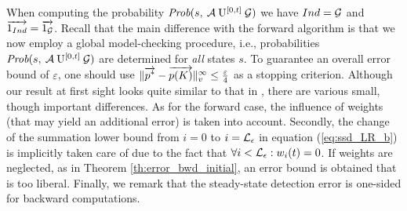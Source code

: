 \documentclass[times, 10pt,twocolumn]{article}
\begin{document}
		When computing the probability $\mbox{\it Prob}(s, \: \mathcal{A} \: \mathrm{U}^{[0,t]} \: \mathcal{G} )$ we have $Ind = \mathcal{G}$ and $\overrightarrow{1_{Ind}} = \overrightarrow{1_{\mathcal{G}}}$. Recall that the main difference with the forward algorithm is that we now employ a global model-checking procedure, i.e., probabilities $\mbox{\it Prob}(s, \: \mathcal{A} \: \mathrm{U}^{[0,t]} \: \mathcal{G} )$ are determined for \emph{all} states $s$. To guarantee an overall error bound of $\varepsilon$, one should use $\lVert  \overrightarrow{p^{*}} - \overrightarrow{p(K)}  \rVert_{v}^{\infty} \leq \frac{\varepsilon}{4}$ as a stopping criterion.  Although our result at first sight looks quite similar to that in \cite{YounesKNP_STTT05}, there are various small, though important differences.  As for the forward case, the influence of weights (that may yield an additional error) is taken into account.  Secondly, the change of the summation lower bound from $i=0$ to $i=\mathcal{L}_{\epsilon}$ in equation (\ref{eq:ssd_LR_b}) is implicitly taken care of due to the fact that $\forall i < \mathcal{L}_{\epsilon} : w_{i}(t) = 0$. If weights are neglected, as in Theorem \ref{th:error_bwd_initial}, an error bound is obtained that is too liberal. Finally, we remark that the steady-state detection error is one-sided for backward computations.
\end{document}
